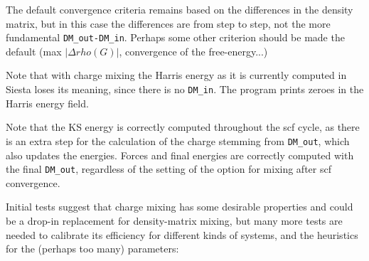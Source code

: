 The default convergence criteria remains based on the differences in
the density matrix, but in this case the differences are from step to
step, not the more fundamental \texttt{DM\_out-DM\_in}. Perhaps some
other criterion should be made the default (max $|\Delta rho(G)|$,
convergence of the free-energy...)

Note that with charge mixing the Harris energy as it is currently
computed in Siesta loses its meaning, since there is no
\texttt{DM\_in}. The program prints zeroes in the Harris energy field.

Note that the KS energy is correctly computed throughout the scf
cycle, as there is an extra step for the calculation of the charge
stemming from \texttt{DM\_out}, which also updates the
energies. Forces and final energies are correctly computed with the
final \texttt{DM\_out}, regardless of the setting of the option for
mixing after scf convergence.

Initial tests suggest that charge mixing has some desirable properties
and could be a drop-in replacement for density-matrix mixing, but many
more tests are needed to calibrate its efficiency for different kinds
of systems, and the heuristics for the (perhaps too many) parameters:

